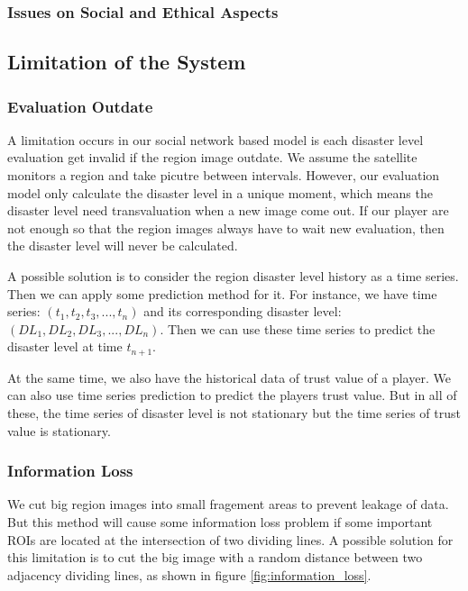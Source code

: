   \subsubsection{Issues on Social and Ethical Aspects}

\subsection{Limitation of the System}

  \subsubsection{Evaluation Outdate}

  A limitation occurs in our social network based model is each disaster level evaluation get invalid 
  if the region image outdate. 
  We assume the satellite monitors a region and take picutre between intervals. However, our evaluation
  model only calculate the disaster level in a unique moment, which means the disaster level need 
  transvaluation when a new image come out.
  If our player are not enough so that the region images always have to wait new evaluation, then the
  disaster level will never be calculated.

  A possible solution is to consider the region disaster level history as a time series. Then we can apply
  some prediction method for it. For instance, we have time series: $(t_1, t_2, t_3, ..., t_n)$
  and its corresponding disaster level: $(DL_1, DL_2, DL_3, ..., DL_n)$.
  Then we can use these time series to predict the disaster level at time $t_{n+1}$.

  At the same time, we also have the historical data of trust value of a player. We can also
  use time series prediction to predict the players trust value. But in all of these, the time series
  of disaster level is not stationary but the time series of trust value is stationary.

  \subsubsection{Information Loss}
  We cut big region images into small fragement areas to prevent leakage of data. 
  But this method will cause some information loss problem if some important ROIs are 
  located at the intersection of two dividing lines.
  A possible solution for this limitation is to cut the big image with a random distance 
  between two adjacency dividing lines, as shown in figure \ref{fig:information_loss}.

